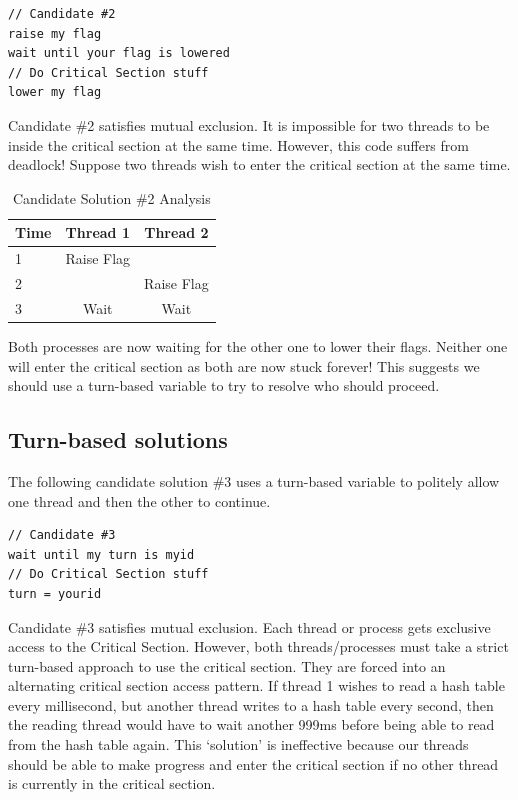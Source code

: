 \begin{lstlisting}
// Candidate #2
raise my flag
wait until your flag is lowered
// Do Critical Section stuff
lower my flag
\end{lstlisting}

Candidate \#2 satisfies mutual exclusion.
It is impossible for two threads to be inside the critical section at the same time.
However, this code suffers from deadlock!
Suppose two threads wish to enter the critical section at the same time.

\begin{table}[h]
  \centering
\caption{Candidate Solution \#2 Analysis}
\begin{tabular}{|l|c|c|}
Time & Thread 1 & Thread 2 \\ \hline
1 & Raise Flag & \\
2 & & Raise Flag \\
3 & Wait & Wait \\
\end{tabular}
\end{table}

Both processes are now waiting for the other one to lower their flags.
Neither one will enter the critical section as both are now stuck forever!
This suggests we should use a turn-based variable to try to resolve who should proceed.

\subsection{Turn-based solutions}

The following candidate solution \#3 uses a turn-based variable to politely allow one thread and then the other to continue.

\begin{lstlisting}
// Candidate #3
wait until my turn is myid
// Do Critical Section stuff
turn = yourid
\end{lstlisting}

Candidate \#3 satisfies mutual exclusion.
Each thread or process gets exclusive access to the Critical Section.
However, both threads/processes must take a strict turn-based approach to use the critical section.
They are forced into an alternating critical section access pattern.
If thread 1 wishes to read a hash table every millisecond, but another thread writes to a hash table every second, then the reading thread would have to wait another 999ms before being able to read from the hash table again.
This `solution' is ineffective because our threads should be able to make progress and enter the critical section if no other thread is currently in the critical section.

